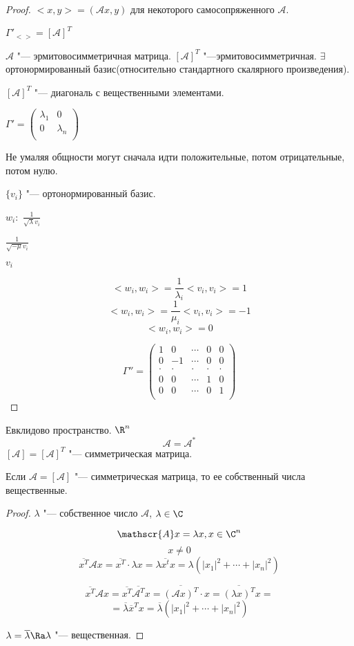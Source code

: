 \begin{proof}
$<x, y> = (\mathscr{A}x, y)$ для некоторого самосопряженного $\mathscr{A}$.

$\Gamma'_{<>} = [\mathscr{A}]^{T}$

$\mathscr{A}$ "--- эрмитовосимметричная матрица. 
$[\mathscr{A}]^T$ "---эрмитовосимметричная. 
$\exists$ ортонормированный базис(относительно стандартного скалярного произведения). 

$[\mathscr{A}]^{T}$ "--- диагональ с вещественными элементами. 

$\Gamma' = \begin{pmatrix}
\lambda_1&0\\
0&\lambda_n\\
\end{pmatrix}$ 

Не умаляя общности могут сначала идти положительные, потом отрицательные, потом нулю. 

$\{v_i\}$ "--- ортонормированный базис. 

$w_i:$
$\frac{1}{\sqrt{\lambda}v_i}$

$\frac{1}{\sqrt{-\mu}v_i}$

$v_i$ 

$$<w_i, w_i> = \frac{1}{\lambda_i} <v_i, v_i> = 1$$
$$<w_i, w_i> = \frac{1}{\mu_i} <v_i, v_i> = -1$$
$$<w_i,w_i> = 0 $$

$$\Gamma'' = \begin{pmatrix}
1&0&\cdots&0&0\\
0&-1&\cdots&0&0\\
\cdot &\cdot & \cdot& \cdot& \cdot\\
0&0&\cdots &1&0\\
0&0&\cdots &0&1\\
\end{pmatrix}$$

\end{proof}

Евклидово пространство. $\R^n$
$$\mathscr{A} = \mathscr{A}^*$$
$[\mathscr{A}] = [\mathscr{A}]^{T}$  "--- симметрическая матрица. 

\begin{lemma}{}
Если $\mathscr{A} = [\mathscr{A}]$ "--- симметрическая матрица, то ее собственный числа вещественные. 
\end{lemma}

\begin{proof}
$\lambda$ "--- собственное число $\mathscr{A}$, $\lambda \in \C$

$$\mathscr{A}x = \lambda x, x \in \C^n$$
$$x \ne 0$$
$$\overline{x^T} \mathscr{A}x  = \overline{x^T} \cdot \lambda x = \lambda \overline{x^t}x = \lambda(|x_1|^2 + \cdots + |x_n|^2)$$

$$\overline{x^T} \mathscr{A}x = \overline{x^{T}} \overline{\mathscr{A}^{T}}x = \overline{(\mathscr{A}x)^T} \cdot x  = \overline{(\lambda x)^T} x = $$
$$= \overline{\lambda}\overline{x}^Tx = \overline{\lambda}(|x_1|^2 + \cdots + |x_n|^2)$$

$\lambda = \overline{\lambda} \Ra \lambda$ "--- вещественная. 
\end{proof}

